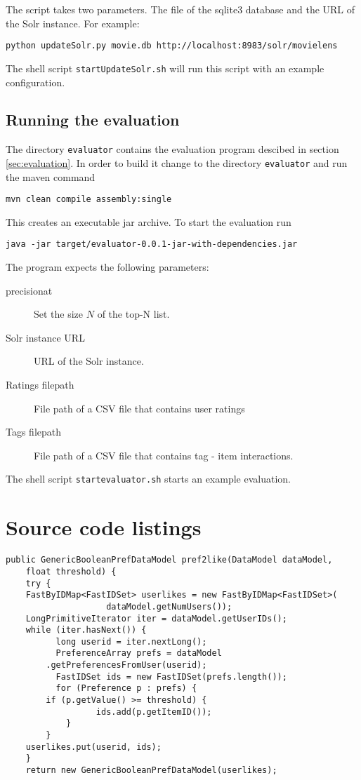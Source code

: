 The script takes two parameters. The file of the sqlite3 database and the URL of the Solr instance. For example:
\begin{verbatim}
python updateSolr.py movie.db http://localhost:8983/solr/movielens
\end{verbatim}

The shell script \verb|startUpdateSolr.sh| will run this script with an example configuration.

\subsection{Running the evaluation}

The directory \verb|evaluator| contains the evaluation program descibed in section \ref{sec:evaluation}. In order to build it change to the directory \verb|evaluator| and run the maven command
\begin{verbatim}
mvn clean compile assembly:single
\end{verbatim}
This creates an executable jar archive. To start the evaluation run 
\begin{verbatim}
java -jar target/evaluator-0.0.1-jar-with-dependencies.jar
\end{verbatim}

The program expects the following parameters:
\begin{description}
\item[precisionat] Set the size $N$ of the top-N list.
\item[Solr instance URL] URL of the Solr instance.
\item[Ratings filepath] File path of a CSV file that contains user ratings
\item[Tags filepath] File path of a CSV file that contains tag - item interactions.
\end{description}

The shell script \verb|startevaluator.sh| starts an example evaluation.

\section{Source code listings}
\label{sec:listings}

\begin{lstlisting}[caption={To simulate the user action ``like'' we extract all ratings equal or above a score of 4.0 and use the result as training set},label={lst:pref2like}]
 public GenericBooleanPrefDataModel pref2like(DataModel dataModel,
	float threshold) {
	try {
	FastByIDMap<FastIDSet> userlikes = new FastByIDMap<FastIDSet>(
					dataModel.getNumUsers());
	LongPrimitiveIterator iter = dataModel.getUserIDs();
	while (iter.hasNext()) {
          long userid = iter.nextLong();
          PreferenceArray prefs = dataModel
		.getPreferencesFromUser(userid);
          FastIDSet ids = new FastIDSet(prefs.length());
          for (Preference p : prefs) {
		if (p.getValue() >= threshold) {
                  ids.add(p.getItemID());
			}
		}
	userlikes.put(userid, ids);
	}
    return new GenericBooleanPrefDataModel(userlikes);
\end{lstlisting}


